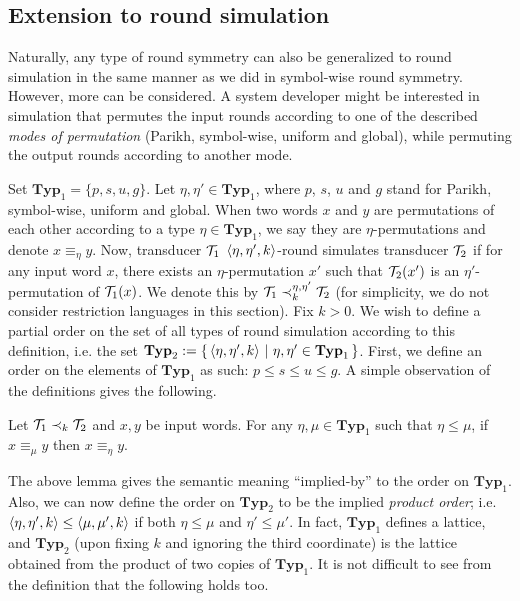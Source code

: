 \subsection{Extension to round simulation}

Naturally, any type of round symmetry can also be generalized to round simulation in the same manner as we did in symbol-wise round symmetry. However, more can be considered. A system developer might be interested in simulation that permutes the input rounds according to one of the described \emph{modes of permutation} (Parikh, symbol-wise, uniform and global), while permuting the output rounds according to another mode.

\newcommand{\RSTYPES}{\ensuremath{\mathbf{Typ}_1}}
\newcommand{\RSTUPS}{\ensuremath{\mathbf{Typ}_2}}
Set $\RSTYPES=\{p, s, u, g\}$. Let $\eta,\eta' \in \RSTYPES$, where $p$, $s$, $u$ and $g$ stand for Parikh, symbol-wise, uniform and global. When two words $x$ and $y$ are permutations of each other according to a type $\eta \in \RSTYPES$, we say they are $\eta$-permutations and denote $x\equiv_\eta y$. Now, transducer $\mathcal{T}_1$ $\left< \eta, \eta', k\right>$-round simulates transducer $\mathcal{T}_2$ if for any input word $x$, there exists an $\eta$-permutation $x'$ such that $\mathcal{T}_2(x')$ is an $\eta'$-permutation of $\mathcal{T}_1(x)$. We denote this by $\mathcal{T}_1 \prec_{k}^{\eta,\eta'} \mathcal{T}_2$ (for simplicity, we do not consider restriction languages in this section).
Fix $k>0$. We wish to define a partial order on the set of all types of round simulation according to this definition, i.e. the set $\RSTUPS:=\condset{\tup{\eta, \eta', k}}{\eta,\eta'\in \RSTYPES}$. First, we define an order on the elements of $\RSTYPES$ as such: $p\leq s\leq u\leq g$. A simple observation of the definitions gives the following.

\begin{lemma}
    Let $\mathcal{T}_1\prec_{k} \mathcal{T}_2$ and $x,y$ be input words. For any $\eta,\mu\in\RSTYPES$ such that $\eta\leq \mu$, if $x\equiv_\mu y$ then $x\equiv_\eta y$.
\end{lemma}

The above lemma gives the semantic meaning ``implied-by'' to the order on $\RSTYPES$. Also, we can now define the order on $\RSTUPS$ to be the implied \emph{product order}; i.e. $\left< \eta, \eta', k\right>\leq \left< \mu, \mu', k\right>$ if both $\eta\leq \mu$ and $\eta'\leq \mu'$. In fact, $\RSTYPES$ defines a lattice, and $\RSTUPS$ (upon fixing $k$ and ignoring the third coordinate) is the lattice obtained from the product of two copies of $\RSTYPES$. It is not difficult to see from the definition that the following holds too.

